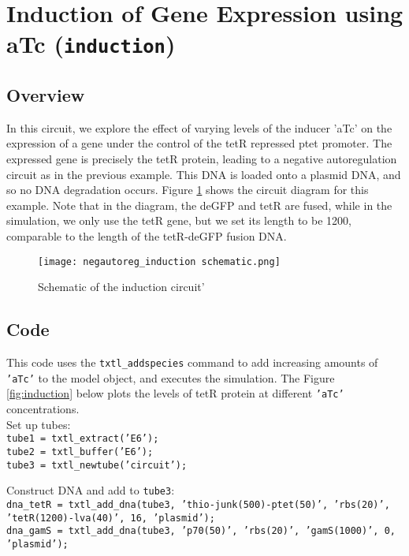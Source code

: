 	\section{Induction of Gene Expression using aTc (\texttt{induction})}
		\subsection{Overview}
		In this circuit, we explore the effect of varying levels of the inducer 'aTc' on the expression of a gene under the control of the tetR repressed ptet promoter. The expressed gene is precisely the tetR protein, leading to a negative autoregulation circuit as in the previous example. This DNA is loaded onto a plasmid DNA, and so no DNA degradation occurs. Figure \ref{fig:inductionSchematic} shows the circuit diagram for this example. Note that in the diagram, the deGFP and tetR are fused, while in the simulation, we only use the tetR gene, but we set its length to be 1200, comparable to the length of the tetR-deGFP fusion DNA. \\ 

		\begin{figure}
		\begin{center}
		\texttt{[image: negautoreg\_induction schematic.png]} 
		\caption{Schematic of the induction circuit'}
		\label{fig:inductionSchematic}
		\end{center}
		\end{figure}		
		
		 
		\subsection{Code}
		This code uses the \texttt{txtl\_addspecies} command to add increasing amounts of \texttt{'aTc'} to the model object, and executes the simulation. The Figure \ref{fig:induction} below plots the levels of tetR protein at different \texttt{'aTc'} concentrations. \\
		
		Set up tubes: \\
\noindent \texttt{tube1 = txtl\_extract('E6');} \\
\texttt{tube2 = txtl\_buffer('E6');} \\
\texttt{tube3 = txtl\_newtube('circuit');} 
\vspace*{1\baselineskip}
		
		Construct DNA and add to \texttt{tube3}: \\						
\noindent \texttt{dna\_tetR = txtl\_add\_dna(tube3, 'thio-junk(500)-ptet(50)', 'rbs(20)', 'tetR(1200)-lva(40)', 16, 'plasmid'); } \\
\texttt{dna\_gamS = txtl\_add\_dna(tube3, 'p70(50)', 'rbs(20)', 'gamS(1000)', 0, 'plasmid');}
\vspace*{1\baselineskip}
			
